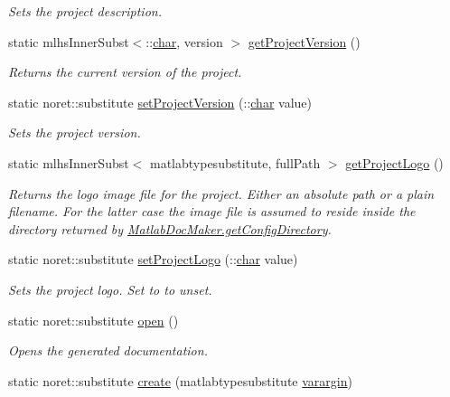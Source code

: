 \begin{DoxyCompactItemize}
\begin{DoxyCompactList}\small\item\em Sets the project description. \end{DoxyCompactList}\item 
static mlhs\+Inner\+Subst$<$\+::\hyperlink{classchar}{char}, version $>$ \hyperlink{class_matlab_doc_maker_afce5384fb7c395546431b7a6c4e1f790}{get\+Project\+Version} ()
\begin{DoxyCompactList}\small\item\em Returns the current version of the project. \end{DoxyCompactList}\item 
static noret\+::substitute \hyperlink{class_matlab_doc_maker_a532ff6bc4beaeff5c3d2f12305bbaa5d}{set\+Project\+Version} (\+::\hyperlink{classchar}{char} value)
\begin{DoxyCompactList}\small\item\em Sets the project version. \end{DoxyCompactList}\item 
static mlhs\+Inner\+Subst$<$ matlabtypesubstitute, full\+Path $>$ \hyperlink{class_matlab_doc_maker_a6767085b13dc2600cb6beda7f7d6acd9}{get\+Project\+Logo} ()
\begin{DoxyCompactList}\small\item\em Returns the logo image file for the project. Either an absolute path or a plain filename. For the latter case the image file is assumed to reside inside the directory returned by \hyperlink{class_matlab_doc_maker_a11a2a8ec616df969a911b325e39b0b4f}{Matlab\+Doc\+Maker.\+get\+Config\+Directory}. \end{DoxyCompactList}\item 
static noret\+::substitute \hyperlink{class_matlab_doc_maker_a6e84afe2189a851665133b6e7c412d4c}{set\+Project\+Logo} (\+::\hyperlink{classchar}{char} value)
\begin{DoxyCompactList}\small\item\em Sets the project logo. Set to \textquotesingle{} to unset. \end{DoxyCompactList}\item 
static noret\+::substitute \hyperlink{class_matlab_doc_maker_ac0a03050ca09039ccd6a1fc97367a38b}{open} ()
\begin{DoxyCompactList}\small\item\em Opens the generated documentation. \end{DoxyCompactList}\item 
static noret\+::substitute \hyperlink{class_matlab_doc_maker_a278883e6b83f6c6e7780e0d567dee119}{create} (matlabtypesubstitute \hyperlink{classvarargin}{varargin})

\end{DoxyCompactItemize}
